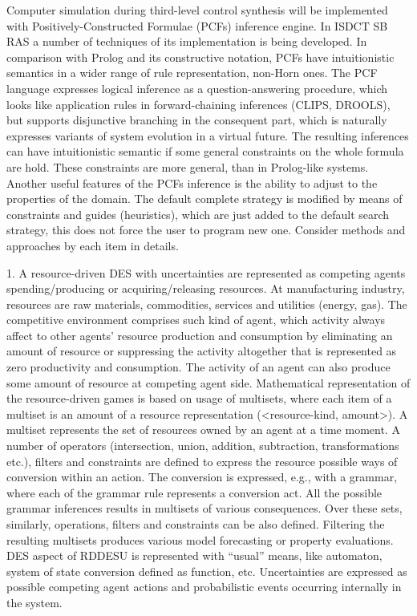 \documentclass[runningheads]{llncs}
\begin{document}
Computer simulation during third-level control synthesis will be implemented with Positively-Constructed Formulae (PCFs) inference engine. In ISDCT SB RAS a number of techniques of its implementation is being developed. In comparison with Prolog and its constructive notation, PCFs have intuitionistic semantics in a wider range of rule representation, non-Horn ones. The PCF language expresses logical inference as a question-answering procedure, which looks like application rules in forward-chaining inferences (CLIPS, DROOLS), but supports disjunctive branching in the consequent part, which is naturally expresses variants of system evolution in a virtual future. The resulting inferences can have intuitionistic semantic if some general constraints on the whole formula are hold. These constraints are more general, than in Prolog-like systems. Another useful features of the PCFs inference is the ability to adjust to the properties of the domain. The default complete strategy is modified by means of constraints and guides (heuristics), which are just added to the default search strategy, this does not force the user to program new one.
Consider methods and approaches by each item in details.

    1. A resource-driven DES with uncertainties are represented as competing agents spending/producing or acquiring/releasing resources. At manufacturing industry, resources are raw materials, commodities, services and utilities (energy, gas). The competitive environment comprises such kind of agent, which activity always affect to other agents' resource production and consumption by eliminating an amount of resource or suppressing the activity altogether that is represented as zero productivity and consumption. The activity of an agent can also produce some amount of resource at competing agent side.
Mathematical representation of the resource-driven games is based on usage of multisets, where each item of a multiset is an amount of a resource representation (<resource-kind, amount>). A multiset represents the set of resources owned by an agent at a time moment. A number of operators (intersection, union, addition, subtraction, transformations etc.), filters and constraints are defined to express the resource possible ways of conversion within an action. The conversion is expressed, e.g., with a grammar, where each of the grammar rule represents a conversion act. All the possible grammar inferences results in multisets of various consequences. Over these sets, similarly, operations, filters and constraints can be also defined. Filtering the resulting multisets produces various model forecasting or property evaluations.
DES aspect of RDDESU is represented with “usual” means, like automaton, system of state conversion defined as function, etc. Uncertainties are expressed as possible competing agent actions and probabilistic events occurring internally in the system.
\end{document}
